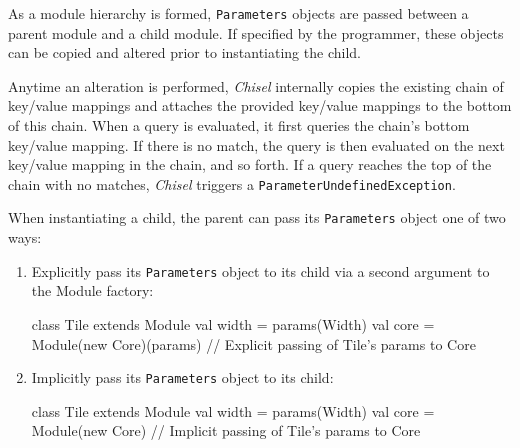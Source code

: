 \documentclass[10pt,twocolumn]{article}
\def\code#1{{\small\tt #1}}
\begin{document}
As a module hierarchy is formed, \code{Parameters} objects are passed between a parent module and a child module. If specified by the programmer, these objects can be copied and altered prior to instantiating the child.

Anytime an alteration is performed, {\em Chisel} internally copies the existing chain of key/value mappings and attaches the provided key/value mappings to the bottom of this chain. When a query is evaluated, it first queries the chain's bottom key/value mapping. If there is no match, the query is then evaluated on the next key/value mapping in the chain, and so forth. If a query reaches the top of the chain with no matches, {\em Chisel} triggers a \code{ParameterUndefinedException}.

When instantiating a child, the parent can pass its \code{Parameters} object one of two ways:
\begin{enumerate}
  \item Explicitly pass its \code{Parameters} object to its child via a second argument to the Module factory:
\begin{scala}
class Tile extends Module { 
  val width = params(Width) 
  val core = Module(new Core)(params)
  // Explicit passing of Tile's params to Core
}
\end{scala}
  \item Implicitly pass its \code{Parameters} object to its child:
\begin{scala}
class Tile extends Module { 
  val width = params(Width)
  val core = Module(new Core)
  // Implicit passing of Tile's params to Core
}
\end{scala}
\end{enumerate}
\end{document}

